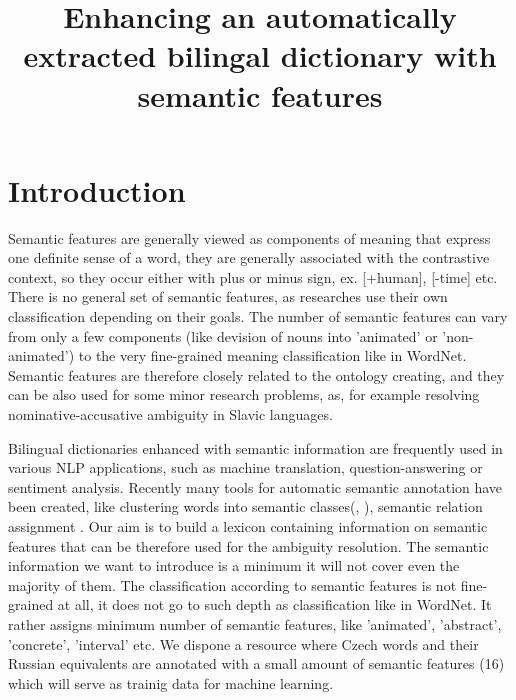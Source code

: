 \documentclass[10pt,a5paper,twoside]{article}
\title{Enhancing an automatically extracted bilingal dictionary with semantic features}
\begin{document}
\maketitle
{} 



\section{Introduction}
Semantic features are generally viewed as components of meaning
that express one definite sense of a word, they are generally associated
with the contrastive context, so they occur either with plus or minus
sign, ex. [+human], [-time] etc. 
There is no general set of semantic features, as researches
use their own classification depending on their goals. The 
number of semantic features can vary from only a few components (like
devision of nouns into 'animated' or 'non-animated') to the very
fine-grained meaning classification like in WordNet. Semantic features
are therefore closely related to the ontology creating, and they
can be also used for some minor research problems, as, for example
resolving nominative-accusative ambiguity in Slavic languages.

Bilingual dictionaries enhanced with semantic information are frequently used 
in various NLP applications, such as machine translation, question-answering
or sentiment analysis. Recently many tools for automatic semantic annotation have been created, like
clustering words into semantic classes(\cite{wordnet},\cite{baroni:2009} ), 
semantic relation assignment \cite{peirsman}.
Our aim is to build a lexicon containing information on semantic
features that can be therefore used for the ambiguity 
resolution. The semantic information we want to introduce is a minimum 
it will not cover even the majority of them. The classification
according to semantic features is not fine-grained at all,
it does not go to such depth as classification like
in WordNet. It rather assigns minimum number of semantic features, like 'animated', 
'abstract', 'concrete', 'interval' etc. We dispone a resource where Czech words and
their Russian equivalents are annotated with a small amount of
semantic features (16) which will serve as trainig data for machine learning.
\end{document}
